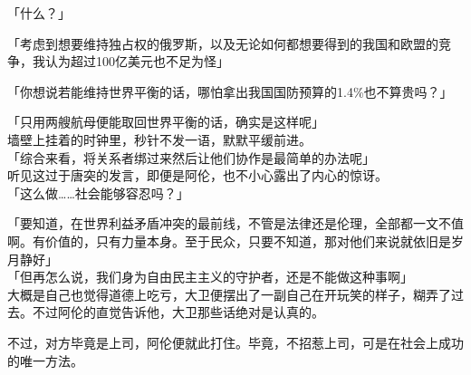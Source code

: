 「什么？」

「考虑到想要维持独占权的俄罗斯，以及无论如何都想要得到的我国和欧盟的竞争，我认为超过100亿美元也不足为怪」

「你想说若能维持世界平衡的话，哪怕拿出我国国防预算的1.4\%也不算贵吗？」

「只用两艘航母便能取回世界平衡的话，确实是这样呢」\\

墙壁上挂着的时钟里，秒针不发一语，默默平缓前进。\\

「综合来看，将关系者绑过来然后让他们协作是最简单的办法呢」\\

听见这过于唐突的发言，即便是阿伦，也不小心露出了内心的惊讶。\\

「这么做……社会能够容忍吗？」

「要知道，在世界利益矛盾冲突的最前线，不管是法律还是伦理，全部都一文不值啊。有价值的，只有力量本身。至于民众，只要不知道，那对他们来说就依旧是岁月静好」\\

「但再怎么说，我们身为自由民主主义的守护者，还是不能做这种事啊」\\

大概是自己也觉得道德上吃亏，大卫便摆出了一副自己在开玩笑的样子，糊弄了过去。不过阿伦的直觉告诉他，大卫那些话绝对是认真的。

不过，对方毕竟是上司，阿伦便就此打住。毕竟，不招惹上司，可是在社会上成功的唯一方法。\\

